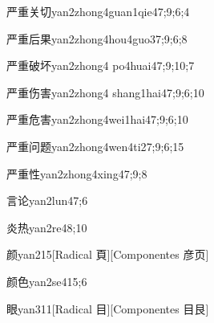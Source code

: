 \begin{verbete}{严重关切}{yan2zhong4guan1qie4}{7;9;6;4}
\end{verbete}

\begin{verbete}{严重后果}{yan2zhong4hou4guo3}{7;9;6;8}
\end{verbete}

\begin{verbete}{严重破坏}{yan2zhong4 po4huai4}{7;9;10;7}
\end{verbete}

\begin{verbete}{严重伤害}{yan2zhong4 shang1hai4}{7;9;6;10}
\end{verbete}

\begin{verbete}{严重危害}{yan2zhong4wei1hai4}{7;9;6;10}
\end{verbete}

\begin{verbete}{严重问题}{yan2zhong4wen4ti2}{7;9;6;15}
\end{verbete}

\begin{verbete}{严重性}{yan2zhong4xing4}{7;9;8}
\end{verbete}

\begin{verbete}{言论}{yan2lun4}{7;6}
\end{verbete}

\begin{verbete}{炎热}{yan2re4}{8;10}
\end{verbete}

\begin{verbete}{颜}{yan2}{15}[Radical 頁][Componentes 彦页]
\end{verbete}

\begin{verbete}{颜色}{yan2se4}{15;6}
\end{verbete}

\begin{verbete}{眼}{yan3}{11}[Radical 目][Componentes 目艮]
\end{verbete}

